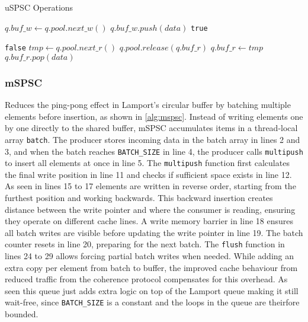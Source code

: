 \begin{algorithm}[!ht]
    \centering
    \captionsetup{justification=centering}
    \caption{\ac{uSPSC} Operations\cite{torquati2010singleproducersingleconsumerqueuessharedcache}}
    \label{alg:uspsc}
    \scriptsize
    \begin{algorithmic}[1]
             
                \State $q.buf\_w \gets q.pool.next\_w()$ 
            \EndIf
            \State $q.buf\_w.push(data)$
            \State \Return \texttt{true}
        \EndFunction
        
        \State
        
                 
                    \State \Return \texttt{false} 
                \EndIf
                 
                    \State $tmp \gets q.pool.next\_r()$
                    \State $q.pool.release(q.buf\_r)$ 
                    \State $q.buf\_r \gets tmp$
                \EndIf
            \EndIf
            \State \Return $q.buf\_r.pop(data)$
        \EndFunction
    \end{algorithmic}
\end{algorithm}

\subsubsection{\acf{mSPSC}}
Reduces the ping-pong effect in Lamport's circular buffer by batching multiple elements before insertion, as shown in \cref{alg:mspsc}. Instead of writing elements one by one directly to the shared buffer, \ac{mSPSC} accumulates items in a thread-local array \texttt{batch}. The producer stores incoming data in the batch array in lines 2 and 3, and when the batch reaches \texttt{BATCH\_SIZE} in line 4, the producer calls \texttt{multipush} to insert all elements at once in line 5. The \texttt{multipush} function first calculates the final write position in line 11 and checks if sufficient space exists in line 12. As seen in lines 15 to 17 elements are written in reverse order, starting from the furthest position and working backwards. This backward insertion creates distance between the write pointer and where the consumer is reading, ensuring they operate on different cache lines. A write memory barrier in line 18 ensures all batch writes are visible before updating the write pointer in line 19. The batch counter resets in line 20, preparing for the next batch. The \texttt{flush} function in lines 24 to 29 allows forcing partial batch writes when needed. While adding an extra copy per element from batch to buffer, the improved cache behaviour from reduced traffic from the coherence protocol compensates for this overhead. As seen this queue just adds extra logic on top of the Lamport queue making it still wait-free, since \texttt{BATCH\_SIZE} is a constant and the loops in the queue are theirfore bounded. \cite{torquati2010singleproducersingleconsumerqueuessharedcache}

